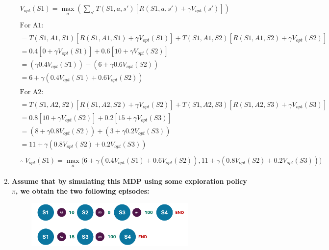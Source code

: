 \documentclass[a4paper]{article}
\begin{document}
\begin{sloppypar}
\begin{enumerate}[start=8,label=Q\arabic*,left=0pt]
    \begin{align*}
        & V_{opt}(S1) = \max_{\substack{a}}\left(\sum_{s'}T(S1, a, s')[R(S1, a, s') + \gamma V_{opt}(s')]\right) \\\\
        & \text{For A1:} \\\\
        & = T(S1, A1, S1)[R(S1, A1, S1) + \gamma V_{opt}(S1)] + T(S1, A1, S2)[R(S1, A1, S2) + \gamma V_{opt}(S2)] \\
        & = 0.4[0 + \gamma V_{opt}(S1)] + 0.6[10 + \gamma V_{opt}(S2)] \\
        & = (\gamma 0.4 V_{opt}(S1)) + (6 + \gamma 0.6 V_{opt}(S2)) \\
        & = 6 + \gamma(0.4 V_{opt}(S1) + 0.6 V_{opt}(S2)) \\\\
        & \text{For A2:} \\\\
        & = T(S1, A2, S2)[R(S1, A2, S2) + \gamma V_{opt}(S2)] + T(S1, A2, S3)[R(S1, A2, S3) + \gamma V_{opt}(S3)] \\
        & = 0.8[10 + \gamma V_{opt}(S2)] + 0.2[15 + \gamma V_{opt}(S3)] \\
        & = (8 + \gamma 0.8 V_{opt}(S2)) + (3 + \gamma 0.2 V_{opt}(S3)) \\
        & = 11 + \gamma(0.8 V_{opt}(S2) + 0.2 V_{opt}(S3)) \\\\
        & \therefore \: V_{opt}(S1) = \max_{\substack{a}} \biggl( 6 + \gamma(0.4 V_{opt}(S1) + 0.6 V_{opt}(S2)), 11 + \gamma(0.8 V_{opt}(S2) + 0.2 V_{opt}(S3)) \biggr)
    \end{align*}

    \item \textbf{Assume that by simulating this MDP using some exploration policy $\pi$, we obtain the
    two following episodes:}

    \begin{figure}[H]
        \centering  
        \includegraphics[width=0.8\textwidth]{Q11_mdp.png}
        \label{fig:Q11_mdp}
    \end{figure}


\end{enumerate}
\end{sloppypar}
\end{document}
